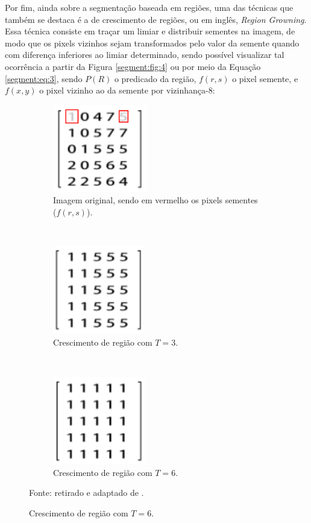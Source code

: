 Por fim, ainda sobre a segmentação baseada em regiões, uma das técnicas que também se destaca é a de crescimento de regiões, ou em inglês, \textit{Region Growning}. Essa técnica consiste em traçar um limiar e distribuir sementes na imagem, de modo que os pixels vizinhos sejam transformados pelo valor da semente quando com diferença inferiores ao limiar determinado, sendo possível visualizar tal ocorrência a partir da Figura \ref{segment:fig:4} ou por meio da Equação \ref{segment:eq:3}, sendo $P(R)$ o predicado da região, $f(r,s)$ o pixel semente, e $f(x,y)$ o pixel vizinho ao da semente por vizinhança-8:

\begin{figure}[H]
   \caption{Crescimento de região.}
   \centering
   \label{segment:fig:4}
    \begin{subfigure}[t]{0.45\textwidth}
        \centering
        \includegraphics[height=1.5in]{recursos/imagens/image_seg/m1.png}
        \caption{Imagem original, sendo em vermelho os pixels sementes ($f(r,s)$).}
        \label{segment:fig:4.1}
    \end{subfigure}
    ~ 
    \begin{subfigure}[t]{0.45\textwidth}
        \centering
        \includegraphics[height=1.5in]{recursos/imagens/image_seg/m2.png}
        \caption{Crescimento de região com $T = 3$.}
        \label{segment:fig:4.2}
    \end{subfigure}
    ~ 

    \begin{subfigure}[t]{0.45\textwidth}
        \centering
        \includegraphics[height=1.5in]{recursos/imagens/image_seg/m3.png}
        \caption{Crescimento de região com $T = 6$.}
        \label{segment:fig:4.3}
    \end{subfigure}

    Fonte: retirado e adaptado de \cite{Yuheng2017}.
\end{figure}

